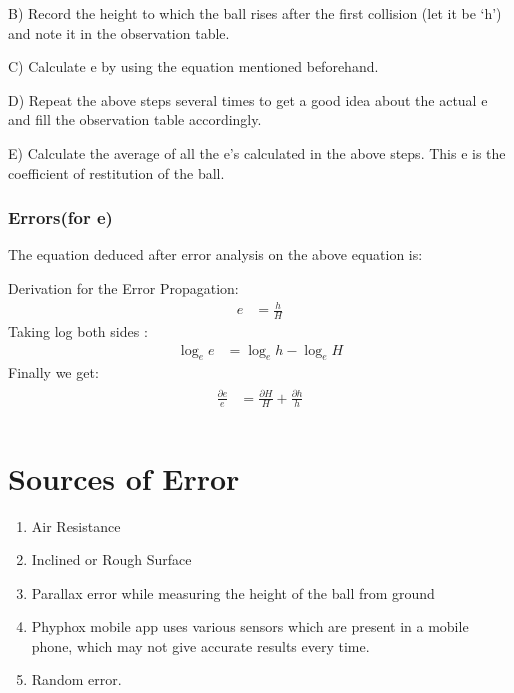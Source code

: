 \documentclass[11pt]{scrartcl} %
\begin{document}
B) Record the height to which the ball rises after the first collision (let it be ‘h’) and note it in the observation table. \par

C) Calculate e by using the equation mentioned beforehand. \par

D) Repeat the above steps several times to get a good idea about the actual e and fill the observation table accordingly. \par

E) Calculate the average of all the e’s calculated in the above steps. This e is the coefficient of restitution of the ball. \par

\subsubsection{Errors(for e)}
The equation deduced after error analysis on the above equation is:\par
Derivation for the Error Propagation:
\begin{align} 
		e &= \frac{h}{H} \nonumber
\end{align}
Taking log both sides :
\begin{align}
\log_e e &= \log_e h - \log_e H \nonumber
\end{align}
   Finally we get:
\begin{align} 
	\begin{split}
		\frac{\partial{e}}{e} &= \frac{\partial{H}}{H} + \frac{\partial{h}}{h}\\
	\end{split}					
\end{align}

\section{Sources of Error}
\begin{enumerate}
	\item Air Resistance
	\item Inclined or Rough Surface
	\item Parallax error while measuring the height of the ball from ground
	\item Phyphox mobile app uses various sensors which are present in a mobile phone, which may not give accurate results every time.
	\item Random error.
\end{enumerate}
\newpage
\end{document}
